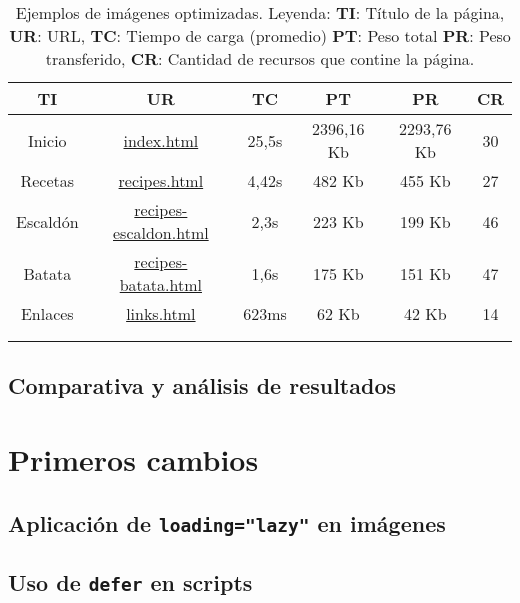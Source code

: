 \documentclass{article}
\begin{document}
\begin{longtable}{c|c|c|c|c|c}
    \hline
    \textbf{TI} & \textbf{UR} & \textbf{TC} & \textbf{PT} & \textbf{PR} & \textbf{CR} \\
    \endhead
    \hline
    Inicio & \href{https://www.danielramos.me/hhyc-dramosac/index.html}{index.html} & 25,5s & 2396,16 Kb & 2293,76 Kb & 30 \\
    Recetas & \href{https://www.danielramos.me/hhyc-dramosac/recipes.html}{recipes.html} & 4,42s & 482 Kb & 455 Kb & 27 \\
    Escaldón & \href{https://www.danielramos.me/hhyc-dramosac/recipes-escaldon.html}{recipes-escaldon.html} & 2,3s & 223 Kb & 199 Kb & 46 \\
    Batata & \href{https://www.danielramos.me/hhyc-dramosac/recipes-batata.html}{recipes-batata.html} & 1,6s & 175 Kb & 151 Kb & 47 \\
    Enlaces & \href{https://www.danielramos.me/hhyc-dramosac/links.html}{links.html} & 623ms & 62 Kb & 42 Kb & 14 \\
    \hline
     \\[1.5ex]
     \caption{
          Ejemplos de imágenes optimizadas.
          Leyenda: 
          \textbf{TI}: Título de la página, 
          \textbf{UR}: URL, 
          \textbf{TC}: Tiempo de carga (promedio) 
          \textbf{PT}: Peso total 
          \textbf{PR}: Peso transferido, 
          \textbf{CR}: Cantidad de recursos que contine la página.
     }
    \label{tab:imagenes-optimizadas}
\end{longtable}

\subsection{Comparativa y análisis de resultados}\label{sec:comparativa-y-analisis-de-resultados}

\section{Primeros cambios}\label{sec:primeros-cambios}

\subsection{Aplicación de \texttt{loading="lazy"} en imágenes}\label{subsec:loading-lazy}

\subsection{Uso de \texttt{defer} en scripts}\label{subsec:defer-en-scripts}
\end{document}
